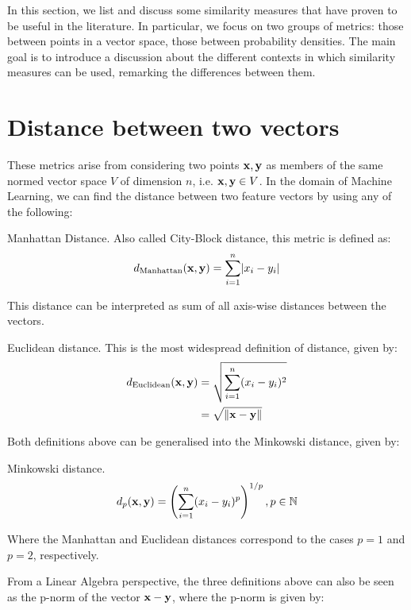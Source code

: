 \documentclass[../main.tex]{subfiles}
\begin{document}
 \label{metrics_review}
In this section, we list and discuss some similarity measures that have proven to be useful in the literature. In particular, we focus on two groups of metrics: those between points in a vector space, those between probability densities. The main goal is to introduce a discussion about the different contexts in which similarity measures can be used, remarking the differences between them.

\section{Distance between two vectors}\label{subsection_eucdist}
These metrics arise from considering two points $\mathbf{x, y}$ as members of the same normed vector space $V$ of dimension $n$, i.e. $\mathbf{x,y} \in V$. In the domain of Machine Learning, we can find the distance between two feature vectors by using any of the following:
\begin{definition}{Manhattan Distance.} \label{def_manhattan}
Also called City-Block distance, this metric is defined as:
\begin{align*}
d_{\text{Manhattan}}(\mathbf{x}, \mathbf{y}) = \sum_{i=1}^n\lvert x_i-y_i\rvert
\end{align*}
\end{definition}
\par This distance can be interpreted as sum of all axis-wise distances between the vectors.
\begin{definition}{Euclidean distance.} \label{def_euclidean}
This is the most widespread definition of distance, given by:
\begin{align*}
d_{\text{Euclidean}}(\mathbf{x}, \mathbf{y}) &= \sqrt{\sum_{i=1}^n(x_i-y_i)^2}\\
&= \sqrt{\left\lVert\mathbf{x}-\mathbf{y}\right\rVert}
\end{align*}
\end{definition}
\par Both definitions above can be generalised into the Minkowski distance, given by:
\begin{definition}{Minkowski distance.} \label{def_minkowski}
\begin{align*}
d_{p}(\mathbf{x}, \mathbf{y}) = \left(\sum_{i=1}^n(x_i-y_i)^{p}\right)^{1/p}, p\in\mathbb{N}
\end{align*}
\end{definition}
\par Where the Manhattan and Euclidean distances correspond to the cases $p=1$ and $p=2$, respectively.
\par From a Linear Algebra perspective, the three definitions above can also be seen as the p-norm of the vector $\mathbf{x}-\mathbf{y}$, where the p-norm is given by:
\end{document}
